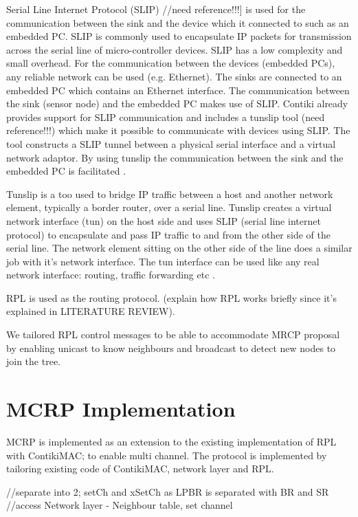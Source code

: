 Serial Line Internet Protocol (SLIP) //need reference!!!] is used for the communication between the sink and the device which it connected to such as an embedded PC. SLIP is commonly used to encapsulate IP packets for transmission across the serial line of micro-controller devices. SLIP has a low complexity and small overhead. For the communication between the devices (embedded PCs), any reliable network can be used (e.g. Ethernet). The sinks are connected to an embedded PC which contains an Ethernet interface. The communication between the sink (sensor node) and the embedded PC makes use of SLIP. Contiki already provides support for SLIP communication and includes a tunslip tool (need reference!!!) which make it possible to communicate with devices using SLIP. The tool constructs a SLIP tunnel between a physical serial interface and a virtual network adaptor. By using tunslip the communication between the sink and the embedded PC is facilitated \cite{multipleSinks}.

Tunslip is a too used to bridge IP traffic between a host and another network element, typically a border router, over a serial line. Tunslip creates a virtual network interface (tun) on the host side and uses SLIP (serial line internet protocol) to encapsulate and pass IP traffic to and from the other side of the serial line. The network element sitting on the other side of the line does a similar job with it's network interface. The tun interface can be used like any real network interface: routing, traffic forwarding etc \cite{tunslip}.

RPL is used as the routing protocol. (explain how RPL works briefly since it's explained in LITERATURE REVIEW).

We tailored RPL control messages to be able to accommodate MRCP proposal by enabling unicast to know neighbours and broadcast to detect new nodes to join the tree.  


\section{MCRP Implementation}
MCRP is implemented as an extension to the existing implementation of RPL with ContikiMAC; to enable multi channel.
The protocol is implemented by tailoring existing code of ContikiMAC, network layer and RPL.

//separate into 2; setCh and xSetCh as LPBR is separated with BR and SR
//access Network layer - Neighbour table, set channel

